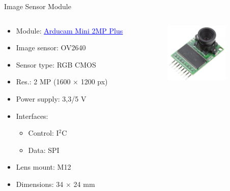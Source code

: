 \begin{frame}{Image Sensor Module}

    \begin{columns}[t]
        \begin{column}[t]{0.6\textwidth}
            \begin{itemize}
                \item Module: \href{https://www.arducam.com/product/arducam-2mp-spi-camera-b0067-arduino/}{\textcolor{blue}{\underline{Arducam Mini 2MP Plus}}}
                \item Image sensor: OV2640
                \item Sensor type: RGB CMOS
                \item Res.: 2 MP (1600 $\times$ 1200 px)
                \item Power supply: 3,3/5 V
                \item Interfaces:
                    \begin{itemize}
                        \item Control: I$^{2}$C
                        \item Data: SPI
                    \end{itemize}
                \item Lens mount: M12
                \item Dimensions: 34 $\times$ 24 mm
            \end{itemize}
        \end{column}
        \begin{column}[t]{0.4\textwidth}
            \begin{figure}[!ht]
                \begin{center}
                    \includegraphics[width=3cm]{figures/arducam-2mp}
                \end{center}
            \end{figure}
            \begin{columns}[t]
                \begin{column}[t]{0.5\textwidth}
                    \begin{figure}[!ht]
                        \begin{center}

\end{center}
\end{figure}
\end{column}
\end{columns}
\end{column}
\end{columns}
\end{frame}
